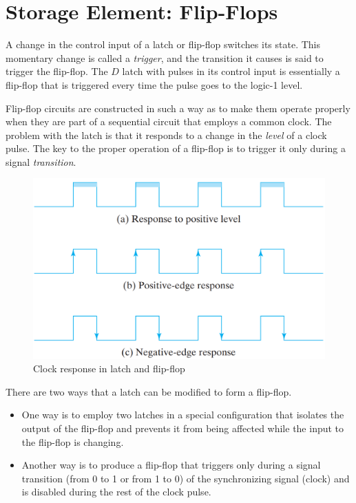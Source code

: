 \section{Storage Element: Flip-Flops}
\label{sec:stor-ele-flip-flop}

A change in the control input of a latch or flip-flop switches its state. This momentary change is called a \textit{trigger}, and the transition it causes is said to trigger the flip-flop. The $D$ latch with pulses in its control input is essentially a flip-flop that is triggered every time the pulse goes to the logic-1 level.

Flip-flop circuits are constructed in such a way as to make them operate properly when they are part of a sequential circuit that employs a common clock. The problem with the latch is that it responds to a change in the \textit{level} of a clock pulse. The key to the proper operation of a flip-flop is to trigger it only during a signal \textit{transition}.

\begin{figure}[H]
  \centering
  \includegraphics[width=\linewidth]{img/fig-5.8.png}
  \caption{Clock response in latch and flip-flop}
  \label{fig:5.8}
\end{figure}

There are two ways that a latch can be modified to form a flip-flop.
\begin{itemize}
  \item One way is to employ two latches in a special configuration that isolates the output of the flip-flop and prevents it from being affected while the input to the flip-flop is changing.
  \item Another way is to produce a flip-flop that triggers only during a signal transition (from 0 to 1 or from 1 to 0) of the synchronizing signal (clock) and is disabled during the rest of the clock pulse.
\end{itemize}

